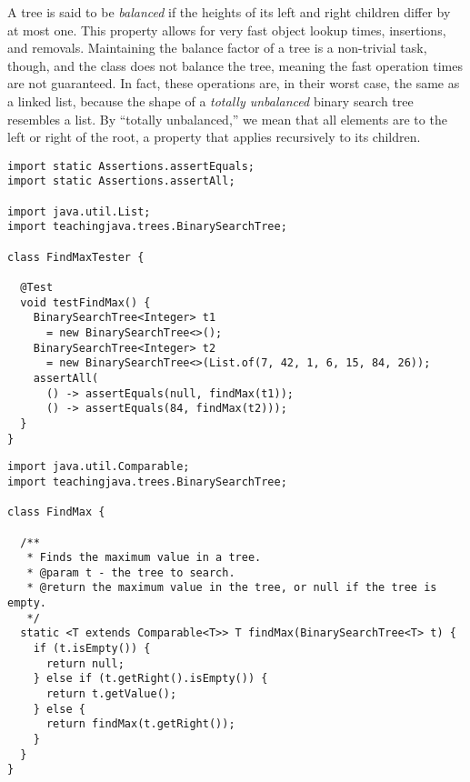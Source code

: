 A tree is said to be \emph{balanced} if the heights of its left and right children differ by at most one.
This property allows for very fast object lookup times, insertions, and removals. 
Maintaining the balance factor of a tree is a non-trivial task, though, and the  class does not balance the tree, meaning the fast operation times are not guaranteed.
In fact, these operations are, in their worst case, the same as a linked list, because the shape of a \emph{totally unbalanced} binary search tree resembles a list. 
By ``totally unbalanced,'' we mean that all elements are to the left or right of the root, a property that applies recursively to its children.


\begin{lstlisting}[language=MyJava]
import static Assertions.assertEquals;
import static Assertions.assertAll;

import java.util.List;
import teachingjava.trees.BinarySearchTree;

class FindMaxTester {

  @Test
  void testFindMax() {
    BinarySearchTree<Integer> t1 
      = new BinarySearchTree<>();
    BinarySearchTree<Integer> t2 
      = new BinarySearchTree<>(List.of(7, 42, 1, 6, 15, 84, 26));
    assertAll(
      () -> assertEquals(null, findMax(t1));
      () -> assertEquals(84, findMax(t2)));
  }
}
\end{lstlisting}

\begin{lstlisting}[language=MyJava]
import java.util.Comparable;
import teachingjava.trees.BinarySearchTree;

class FindMax {

  /**
   * Finds the maximum value in a tree.
   * @param t - the tree to search.
   * @return the maximum value in the tree, or null if the tree is empty.
   */
  static <T extends Comparable<T>> T findMax(BinarySearchTree<T> t) {
    if (t.isEmpty()) {
      return null;
    } else if (t.getRight().isEmpty()) {
      return t.getValue();
    } else {
      return findMax(t.getRight());
    }
  }
}
\end{lstlisting}

